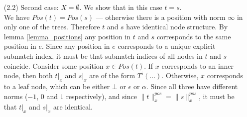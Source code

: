 \documentclass[AMA,STIX1COL]{WileyNJD-v2}
\newcommand{\pnorm}[2]{\|{#1}\|^{pos}_{#2}}
\begin{document}
\begin{proofEnd}
\begin{itemize}[itemsep=0.3em, topsep=0.5em]
\begin{itemize}[itemsep=0.5em]
                \item[(2.2)] Second case: $X = \emptyset$.
                    We show that in this case $t = s$.
                    \\[0.5em]
                    We have $Pos(t) = Pos(s)$ --- otherwise there is a position with norm $\infty$ in only one of the trees.
                    Therefore $t$ and $s$ have identical node structure.
                    By lemma \ref{lemma_positions} any position in $t$ and $s$ corresponds to the same position in $e$.
                    Since any position in $e$ corresponds to a unique explicit submatch index,
                    it must be that submatch indices of all nodes in $t$ and $s$ coincide.
                    Consider some position $x \in Pos(t)$.
                    If $x$ corresponds to an inner node, then both $t|_x$ and $s|_x$ are of the form $T^i(\hdots)$.
                    Otherwise, $x$ corresponds to a leaf node, which can be either $\bot$ or $\epsilon$ or $\alpha$.
                    Since all three have different norms ($-1$, $0$ and $1$ respectively),
                    and since $\pnorm{t}{x} = \pnorm{s}{x}$, it must be that $t|_x$ and $s|_x$ are identical.
            \end{itemize}
    \end{itemize}
\end{proofEnd}
\vspace{-0.5em}
\end{document}
